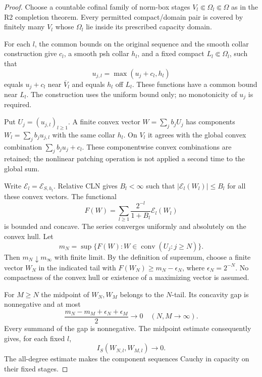 \documentclass[11pt,a4paper]{article}
\numberwithin{equation}{section}
\theoremstyle{definition}
\theoremstyle{remark}
\begin{document}
\begin{proof}
Choose a countable cofinal family of norm-box stages
$V_l\Subset\Omega_l\Subset\Omega$ as in the R2 completion theorem.
Every permitted compact/domain pair is covered by finitely many
$V_l$ whose $\Omega_l$ lie inside its prescribed capacity domain.

For each $l$, the common bounds on the original sequence and
the smooth collar construction give $c_l$, a smooth psh collar
$h_l$, and a fixed compact $L_l\Subset\Omega_l$, such that
\[
 u_{j,l}=\max(u_j+c_l,h_l)
\]
equals $u_j+c_l$ near $\overline V_l$ and equals $h_l$ off $L_l$.
These functions have a common bound near $L_l$. The construction
uses the uniform bound only; no monotonicity of $u_j$ is required.

Put $U_j=(u_{j,l})_{l\geq1}$. A finite convex vector
$W=\sum_jb_jU_j$ has components $W_l=\sum_jb_ju_{j,l}$ with
the same collar $h_l$. On $V_l$ it agrees with the global
convex combination $\sum_jb_ju_j+c_l$. These componentwise
convex combinations are retained; the nonlinear patching
operation is not applied a second time to the global sum.

Write $\mathcal E_l=\mathcal E_{S,h_l}$. Relative CLN gives
$B_l<\infty$ such that $|\mathcal E_l(W_l)|\leq B_l$ for
all these convex vectors. The functional
\[
 F(W)=\sum_{l\geq1}\frac{2^{-l}}{1+B_l}\mathcal E_l(W_l)
\]
is bounded and concave. The series converges uniformly and
absolutely on the convex hull. Let
\[
 m_N=\sup\{F(W):W\in\operatorname{conv}(U_j:j\geq N)\}.
\]
Then $m_N\downarrow m_\infty$ with finite limit. By the
definition of supremum, choose a finite vector $W_N$ in
the indicated tail with $F(W_N)\geq m_N-\epsilon_N$,
where $\epsilon_N=2^{-N}$. No compactness of the convex
hull or existence of a maximizing vector is assumed.

For $M\geq N$ the midpoint of $W_N,W_M$ belongs to the
$N$-tail. Its concavity gap is nonnegative and at most
\[
 \frac{m_N-m_M+\epsilon_N+\epsilon_M}{2}\longrightarrow0
       \quad(N,M\to\infty).
\]
Every summand of the gap is nonnegative. The midpoint
estimate consequently gives, for each fixed $l$,
\[
 I_S(W_{N,l},W_{M,l})\longrightarrow0.
\]
The all-degree estimate makes the component sequences
Cauchy in capacity on their fixed stages.


\end{proof}
\end{document}
